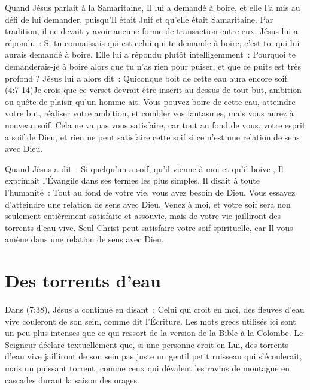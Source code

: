 Quand Jésus parlait à la Samaritaine, Il lui a demandé à boire,
 et elle l'a mis au défi de lui demander, puisqu'Il était Juif
 et qu'elle était Samaritaine. Par tradition, il ne devait y avoir
 aucune forme de transaction entre eux. Jésus lui a répondu~:
 \og Si tu connaissais qui est celui qui te demande à boire,
 c'est toi qui lui aurais demandé à boire. \fg{}
 Elle lui a répondu plutôt intelligemment~:
 \og Pourquoi te demanderais-je à boire alors que tu n'as rien pour puiser,
 et que ce puits est très profond ? \fg{} Jésus lui a alors dit~:
 \og Quiconque boit de cette eau aura encore soif. \fg{}
 (4:7-14)Je crois que ce verset devrait être inscrit
 au-dessus de tout but,
 ambition ou quête de plaisir qu'un homme ait.
 Vous pouvez boire de cette eau, atteindre votre but, réaliser votre ambition,
 et combler vos fantasmes, mais vous aurez à nouveau soif.
 Cela ne va pas vous satisfaire, car tout au fond de vous,
 votre esprit a soif de Dieu, et rien ne peut satisfaire cette soif
 si ce n'est une relation de sens avec Dieu.

Quand Jésus a dit~: \og Si quelqu'un a soif, qu'il vienne à moi
 et qu'il boive \fg{}, Il exprimait l'Évangile dans ses termes
 les plus simples. Il disait à toute l'humanité~:
 \og Tout au fond de votre vie, vous avez besoin de Dieu.
 Vous essayez d'atteindre une relation de sens avec Dieu.
 Venez à moi, et votre soif sera non seulement entièrement satisfaite
 et assouvie, mais de votre vie jailliront des torrents d'eau vive. \fg{}
 Seul Christ peut satisfaire votre soif spirituelle,
 car Il vous amène dans une relation de sens avec Dieu.


\section*{Des torrents d'eau}

Dans (7:38), Jésus a continué en disant~:
 \og Celui qui croit en moi, des fleuves d'eau vive couleront de son sein,
 comme dit l'Écriture. \fg{}
 Les mots grecs utilisés ici sont un peu plus intenses que ce qui ressort
 de la version de la Bible à la Colombe. Le Seigneur déclare textuellement
 que, si une personne croit en Lui, \og des torrents d'eau vive jailliront
 de son sein \fg{} \ocadr pas juste un gentil petit ruisseau qui s'écoulerait,
 mais un puissant torrent, comme ceux qui dévalent les ravins de montagne
 en cascades durant la saison des orages.

